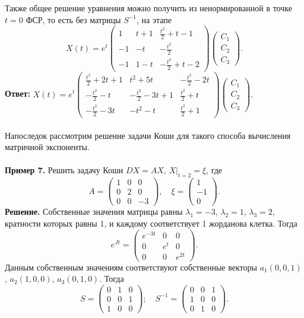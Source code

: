 \documentclass[a4paper, 12pt]{article}
\begin{document}
Также общее решение уравнения можно получить из ненормированной в точке $t= 0$ ФСР, то есть без матрицы $S^{-1}$, на этапе $$X(t) =e^t\begin{pmatrix}
	1 & t+1 & \frac{t^2}{2} + t - 1\\
	-1 & -t & -\frac{t^2}{2}\\
	-1 & 1-t & -\frac{t^2}{2} + t - 2
\end{pmatrix}\begin{pmatrix}
	C_1\\C_2\\C_3
\end{pmatrix}.$$
\textbf{Ответ:} $X(t)=e^t\begin{pmatrix}
	\frac{t^2}{2} + 2t + 1 & t^2+5t & -\frac{t^2}{2} -2t\\
	-\frac{t^2}{2} -t & -\frac{t^2}{2} -3t + 1 & \frac{t^2}{2} + t\\
	-\frac{t^2}{2} -3 t & -t^2-t & \frac{t^2}{2} + 1
\end{pmatrix}\begin{pmatrix}
	C_1\\C_2\\C_3
\end{pmatrix}.$\\\\
Напоследок рассмотрим решение задачи Коши для такого способа вычисления матричной экспоненты.\\\\
\textbf{Пример 7.} Решить задачу Коши $DX = AX$, $X|_{t=2} = \xi$, где 
$$A = \begin{pmatrix}
	1 & 0 & 0\\
	0 & 2 & 0\\
	0 & 0 & -3
\end{pmatrix},\quad \xi = \begin{pmatrix}
1 \\ -1 \\ 0
\end{pmatrix}.$$
\textbf{Решение.} Собственные значения матрицы равны $\lambda_1 = -3$, $\lambda_2 = 1$, $\lambda_3 = 2$, кратности которых равны 1, и каждому соответствует 1 жорданова клетка. Тогда
$$e^{Jt} = \begin{pmatrix}
	e^{-3t} & 0 & 0\\
	0 & e^{t} & 0\\
	0 & 0 & e^{2t} 
\end{pmatrix}.$$
Данным собственным значениям соответствуют собственные векторы $a_1(0, 0, 1)$, $a_2(1, 0, 0)$, $a_3(0, 1, 0)$. Тогда
$$S = \begin{pmatrix}
	0 & 1 & 0\\
	0 & 0 & 1\\
	1 & 0 & 0
\end{pmatrix};\quad S^{-1} = \begin{pmatrix}
0 & 0 & 1\\
1 & 0 & 0\\
0 & 1 & 0
\end{pmatrix}.$$
\end{document}
